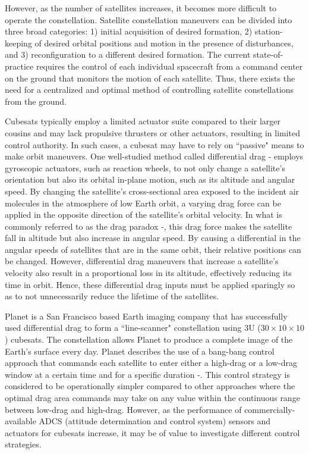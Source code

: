 \documentclass[letterpaper, 10 pt, conference]{ieeeconf}  %
\begin{document}
However, as the number of satellites increases, it becomes more difficult to operate the constellation. Satellite constellation maneuvers can be divided into three broad categories: 1) initial acquisition of desired formation, 2) station-keeping of desired orbital positions and motion in the presence of disturbances, and 3) reconfiguration to a different desired formation. The current state-of-practice requires the control of each individual spacecraft from a command center on the ground that monitors the motion of each satellite. Thus, there exists the need for a centralized and optimal method of controlling satellite constellations from the ground.

Cubesats typically employ a limited actuator suite compared to their larger cousins and may lack propulsive thrusters or other actuators, resulting in limited control authority. In such cases, a cubesat may have to rely on ``passive" means to make orbit maneuvers. One well-studied method called differential drag \cite{DiffDrag1}-\cite{DiffDrag2} employs gyroscopic actuators, such as reaction wheels, to not only change a satellite's orientation but also its orbital in-plane motion, such as its altitude and angular speed. By changing the satellite's cross-sectional area exposed to the incident air molecules in the atmosphere of low Earth orbit, a varying drag force can be applied in the opposite direction of the satellite's orbital velocity. In what is commonly referred to as the drag paradox \cite{DragParadox1}-\cite{DragParadox2}, this drag force makes the satellite fall in altitude but also increase in  angular speed. By causing a differential in the angular speeds of satellites that are in the same orbit, their relative positions can be changed. However, differential drag maneuvers that increase a satellite's velocity also result in a proportional loss in its altitude, effectively reducing its time in orbit. Hence, these differential drag inputs must be applied sparingly so as to not unnecessarily reduce the lifetime of the satellites.

Planet is a San Francisco based Earth imaging company that has successfully used differential drag to form a ``line-scanner" constellation using 3U ($30\times10\times10$) cubesats. The constellation allows Planet to produce a complete image of the Earth's surface every day. Planet describes the use of a bang-bang control approach that commands each satellite to enter either a high-drag or a low-drag window at a certain time and for a specific duration \cite{Planet1}-\cite{Planet2}. This control strategy is considered to be operationally simpler compared to other approaches where the optimal drag area commands may take on any value within the continuous range between low-drag and high-drag. However, as the performance of commercially-available ADCS (attitude determination and control system) sensors and actuators for cubesats increase, it may be of value to investigate different control strategies.
\end{document}
